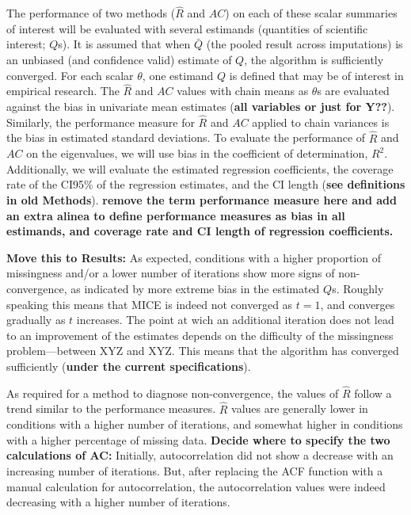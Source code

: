 \documentclass[Royal,times,sageh]{sagej}
\begin{document}
The performance of two methods (\(\widehat{R}\) and \(AC\)) on each of
these scalar summaries of interest will be evaluated with several
estimands (quantities of scientific interest; \(Q\)s). It is assumed
that when \(\bar{Q}\) (the pooled result across imputations) is an
unbiased (and confidence valid) estimate of \(Q\), the algorithm is
sufficiently converged. For each scalar \(\theta\), one estimand \(Q\)
is defined that may be of interest in empirical research. The
\(\widehat{R}\) and \(AC\) values with chain means as \(\theta\)s are
evaluated against the bias in univariate mean estimates (\textbf{all
variables or just for Y??}). Similarly, the performance measure for
\(\widehat{R}\) and \(AC\) applied to chain variances is the bias in
estimated standard deviations. To evaluate the performance of
\(\widehat{R}\) and \(AC\) on the eigenvalues, we will use bias in the
coefficient of determination, \(R^2\). Additionally, we will evaluate
the estimated regression coefficients, the coverage rate of the CI95\%
of the regression estimates, and the CI length (\textbf{see definitions
in old Methods}). \textbf{remove the term performance measure here and
add an extra alinea to define performance measures as bias in all
estimands, and coverage rate and CI length of regression coefficients.}

\textbf{Move this to Results:} As expected, conditions with a higher
proportion of missingness and/or a lower number of iterations show more
signs of non-convergence, as indicated by more extreme bias in the
estimated \(Q\)s. Roughly speaking this means that MICE is indeed not
converged as \(t=1\), and converges gradually as \(t\) increases. The
point at wich an additional iteration does not lead to an improvement of
the estimates depends on the difficulty of the missingness
problem---between XYZ and XYZ. This means that the algorithm has
converged sufficiently (\textbf{under the current specifications}).

As required for a method to diagnose non-convergence, the values of
\(\widehat{R}\) follow a trend similar to the performance measures.
\(\widehat{R}\) values are generally lower in conditions with a higher
number of iterations, and somewhat higher in conditions with a higher
percentage of missing data. \textbf{Decide where to specify the two
calculations of AC:} Initially, autocorrelation did not show a decrease
with an increasing number of iterations. But, after replacing the ACF
function with a manual calculation for autocorrelation, the
autocorrelation values were indeed decreasing with a higher number of
iterations.
\end{document}
